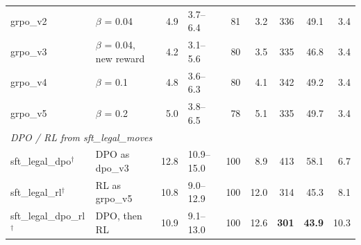 \begin{table}[t]
\begin{tabular}{llrlrrrrr}
grpo\_v2 & $\beta$ = 0.04 & 4.9 & 3.7--6.4 & 81 & 3.2 & 336 & 49.1 & 3.4 \\
grpo\_v3 & $\beta$ = 0.04, new reward & 4.2 & 3.1--5.6 & 80 & 3.5 & 335 & 46.8 & 3.4 \\
grpo\_v4 & $\beta$ = 0.1 & 4.8 & 3.6--6.3 & 80 & 4.1 & 342 & 49.2 & 3.4 \\
grpo\_v5 & $\beta$ = 0.2 & 5.0 & 3.8--6.5 & 78 & 5.1 & 335 & 49.7 & 3.4 \\
\midrule
\multicolumn{9}{l}{\emph{DPO / RL from sft\_legal\_moves}} \\
sft\_legal\_dpo$^\dagger$ & DPO as dpo\_v3 & 12.8 & 10.9--15.0 & 100 & 8.9 & 413 & 58.1 & 6.7 \\
sft\_legal\_rl$^\dagger$ & RL as grpo\_v5 & 10.8 & 9.0--12.9 & 100 & 12.0 & 314 & 45.3 & 8.1 \\
sft\_legal\_dpo\_rl$^\dagger$ & DPO, then RL & 10.9 & 9.1--13.0 & 100 & 12.6 & \textbf{301} & \textbf{43.9} & 10.3 \\
\bottomrule
\end{tabular}
\end{table}
